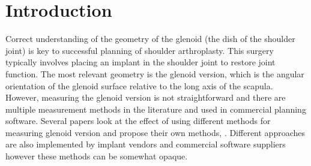 \section{Introduction}
\label{sec:introduction}
Correct understanding of the geometry of the glenoid (the dish of the shoulder joint) is
key to successful planning of shoulder arthroplasty. This surgery typically involves
placing an implant in the shoulder joint to restore joint function. The most relevant
geometry is the glenoid version, which is the angular orientation of the glenoid surface
relative to the long axis of the scapula. However, measuring the glenoid version is not
straightforward and there are multiple measurement methods in the literature and used in
commercial planning software. Several papers look at the effect of using 
different methods for measuring glenoid version and propose their own 
methods, \cite{PMID:33330245, PMID:32010231, PMID:29298261, PMID:33554174}. 
Different approaches are also implemented by implant vendors and commercial 
software suppliers \cite{blueprint, exactech, djosurgical} however these methods can 
be somewhat opaque. 
